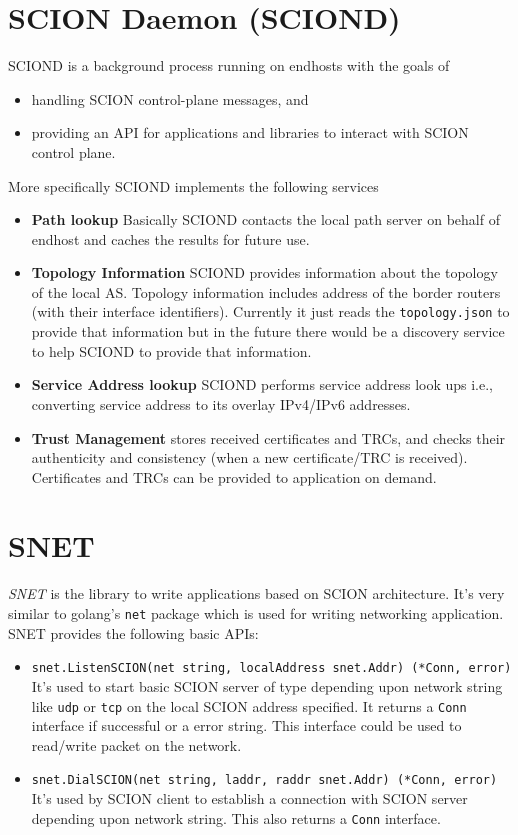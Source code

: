 \section{SCION Daemon (SCIOND)} \label{background:sciond}
SCIOND is a background process running on endhosts with the goals of
\begin{itemize}
    \item handling SCION control-plane messages, and
    \item providing an API for applications and libraries to interact with SCION control plane.
\end{itemize}
More specifically SCIOND implements the following services
\begin{itemize}
    \item \textbf{Path lookup} Basically SCIOND contacts the local path server on behalf of endhost and caches the results for future use.
    \item \textbf{Topology Information} SCIOND provides information about the topology of the local AS. Topology information includes address of the border routers (with their interface identifiers). Currently it just reads the \texttt{topology.json} to provide that information but in the future there would be a discovery service to help SCIOND to provide that information.
    \item \textbf{Service Address lookup} SCIOND performs service address look ups i.e., converting service address to its overlay IPv4/IPv6 addresses.
    \item \textbf{Trust Management} stores received certificates and TRCs, and checks their authenticity and consistency (when a new certificate/TRC is received). Certificates and TRCs can be provided to application on demand.
\end{itemize}

\section{SNET}
\textit{SNET} is the library to write applications based on SCION architecture. It's very similar to golang's \texttt{net} package which is used for writing networking application. SNET provides the following basic APIs:
\begin{itemize}
    \item \texttt{snet.ListenSCION(net string, localAddress snet.Addr) (*Conn, error)} \\
    It's used to start basic SCION server of type depending upon network string like \texttt{udp} or \texttt{tcp} on the local SCION address specified. It returns a \texttt{Conn} interface if successful or a error string. This interface could be used to read/write packet on the network.
    \item \texttt{snet.DialSCION(net string, laddr, raddr snet.Addr) (*Conn, error)}
    It's used by SCION client to establish a connection with SCION server depending upon network string. This also returns a \texttt{Conn} interface.
\end{itemize}

